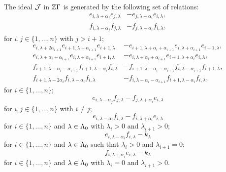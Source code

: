 \documentclass[a4paper, 11pt]{report}
\begin{document}
The ideal $\mathcal{J}$ in $\mathbb{Z}\Gamma$ is generated by the following set of relations:
\begin{align*}
e_{i,\lambda+\alpha_j}e_{j,\lambda} &- e_{j,\lambda+\alpha_i}e_{i,\lambda},\\
f_{i,\lambda-\alpha_j}f_{j,\lambda} &- f_{j,\lambda-\alpha_i}f_{i,\lambda},
\end{align*}
for $i,j\in\{1,\ldots,n\}$ with $j>i+1$;
\begin{align*}
e_{i,\lambda+2\alpha_{i+1}}e_{i+1,\lambda+\alpha_{i+1}}e_{i+1,\lambda} &- e_{i+1,\lambda+\alpha_i+\alpha_{i+1}}e_{i,\lambda+\alpha_{i+1}}e_{i+1,\lambda},\\
e_{i,\lambda+\alpha_i+\alpha_{i+1}}e_{i,\lambda+\alpha_{i+1}}e_{i+1,\lambda} &- e_{i,\lambda+\alpha_i+\alpha_{i+1}}e_{i+1,\lambda+\alpha_i}e_{i,\lambda},\\
f_{i+1,\lambda-\alpha_i-\alpha_{i+1}}f_{i+1,\lambda-\alpha_i}f_{i,\lambda} &- f_{i+1,\lambda-\alpha_i-\alpha_{i+1}}f_{i,\lambda-\alpha_{i+1}}f_{i+1,\lambda},\\
f_{i+1,\lambda-2\alpha_i}f_{i,\lambda-\alpha_i}f_{i,\lambda} &- f_{i,\lambda-\alpha_i-\alpha_{i+1}}f_{i+1,\lambda-\alpha_i}f_{i,\lambda},
\end{align*}
for $i\in\{1,\ldots,n\}$;
\begin{equation*}
e_{i,\lambda-\alpha_j}f_{j,\lambda} - f_{j,\lambda+\alpha_i}e_{i,\lambda}
\end{equation*}
for $i,j\in\{1,\ldots,n\}$ with $i\neq j$;
\begin{equation*}
e_{i,\lambda-\alpha_i}f_{i,\lambda} - f_{i,\lambda+\alpha_i}e_{i,\lambda}
\end{equation*}
for $i\in\{1,\ldots,n\}$ and $\lambda\in\Lambda_0{}$ with $\lambda_i>0$ and $\lambda_{i+1}>0$;
\begin{equation*}
e_{i,\lambda-\alpha_i}f_{i,\lambda} - k_\lambda
\end{equation*}
for $i\in\{1,\ldots,n\}$ and $\lambda\in\Lambda_0{}$ such that $\lambda_i>0$ and $\lambda_{i+1}=0$;
\begin{equation*}
f_{i,\lambda+\alpha_i}e_{i,\lambda} - k_\lambda
\end{equation*}
for $i\in\{1,\ldots,n\}$ and $\lambda\in\Lambda_0{}$ with $\lambda_i=0$ and $\lambda_{i+1}>0$.
\end{document}
